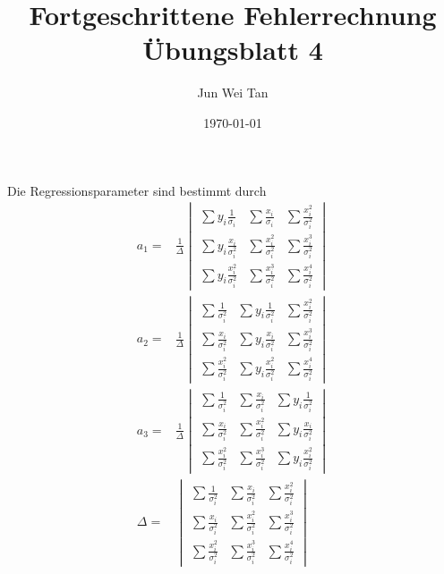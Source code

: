 \documentclass[prb,12pt]{revtex4-2}
\theoremstyle{definition}
\theoremstyle{definition}
\begin{document}
\title{Fortgeschrittene Fehlerrechnung Übungsblatt 4}
	\author{Jun Wei Tan}
	\date{\today}
	\maketitle
Die Regressionsparameter sind bestimmt durch
\begin{align*}
	a_1=&\frac 1\Delta \begin{vmatrix}
		\sum y_i \frac{1}{\sigma_i} & \sum \frac{x_i}{\sigma_i} & \sum \frac{x_i^2}{\sigma_i^2} \\ 
		\sum y_i \frac{x_i}{\sigma_i^2} & \sum \frac{x_i^2}{\sigma_i^2} & \sum \frac{x_i^3}{\sigma_i^2} \\
		\sum y_i \frac{x_i^2}{\sigma_i^2} & \sum \frac{x_i^3}{\sigma_i^2} & \sum \frac{x_i^4}{\sigma_i^2}
	\end{vmatrix}\\
a_2=&\frac 1\Delta \begin{vmatrix}
	\sum \frac{1}{\sigma_i^2} & \sum y_i \frac{1}{\sigma_i^2} & \sum \frac{x_i^2}{\sigma_i^2} \\
	\sum \frac{x_i}{\sigma_i^2} & \sum y_i \frac{x_i}{\sigma_i^2} & \sum \frac{x_i^3}{\sigma_i^2} \\
	\sum \frac{x_i^2}{\sigma_i^2} & \sum y_i\frac{x_i^2}{\sigma_i^2} & \sum \frac{x_i^4}{\sigma_i^2}
\end{vmatrix}\\
a_3=& \frac 1\Delta \begin{vmatrix}
	\sum \frac{1}{\sigma_i^2} & \sum\frac{x_i}{\sigma_i^2} & \sum y_i \frac{1}{\sigma_i^2}\\
	\sum \frac{x_i}{\sigma_i^2} & \sum\frac{x_i^2}{\sigma_i^2} & \sum y_i\frac{x_i}{\sigma_i^2} \\
	\sum \frac{x_i^2}{\sigma_i^2} & \sum \frac{x_i^3}{\sigma_i^2} & \sum y_i \frac{x_i^2}{\sigma_i^2}
\end{vmatrix}\\
\Delta=&\begin{vmatrix}
	\sum \frac{1}{\sigma_i^2} & \sum \frac{x_i}{\sigma_i^2} & \sum \frac{x_i^2}{\sigma_i^2} \\ \sum \frac{x_i}{\sigma_i^2} & \sum \frac{x_i^2}{\sigma_i^2} & \sum\frac{x_i^3}{\sigma_i^2} \\
	\sum \frac{x_i^2}{\sigma_i^2} & \sum \frac{x_i^3}{\sigma_i^2} & \sum\frac{x_i^4}{\sigma_i^2}
\end{vmatrix}
\end{align*}
\end{document}
